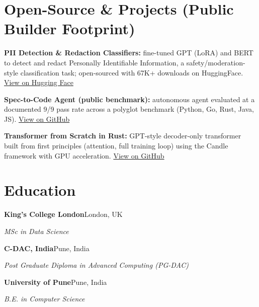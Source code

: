 \documentclass[10pt,a4paper]{article}
\begin{document}
\section{Open-Source \& Projects (Public Builder Footprint)}
\begin{tight}
  \item \textbf{PII Detection \& Redaction Classifiers:} fine-tuned GPT (LoRA) and BERT to detect and redact Personally Identifiable Information, a safety/moderation-style classification task; open-sourced with 67K+ downloads on HuggingFace. \href{https://huggingface.co/ab-ai/pii_model}{View on Hugging Face}
  \item \textbf{Spec-to-Code Agent (public benchmark):} autonomous agent evaluated at a documented 9/9 pass rate across a polyglot benchmark (Python, Go, Rust, Java, JS). \href{https://github.com/abhijeetscode/Spec-to-Code-Agent}{View on GitHub}
  \item \textbf{Transformer from Scratch in Rust:} GPT-style decoder-only transformer built from first principles (attention, full training loop) using the Candle framework with GPU acceleration. \href{https://github.com/abhijeetscode/transformer-rust}{View on GitHub}
\end{tight}

\section{Education}
{\color{company}\bfseries King's College London}\hfill {\color{muted}London, UK}\par
{\itshape MSc in Data Science}\par\vspace{2pt}
{\color{company}\bfseries C-DAC, India}\hfill {\color{muted}Pune, India}\par
{\itshape Post Graduate Diploma in Advanced Computing (PG-DAC)}\par\vspace{2pt}
{\color{company}\bfseries University of Pune}\hfill {\color{muted}Pune, India}\par
{\itshape B.E. in Computer Science}\par
\end{document}

